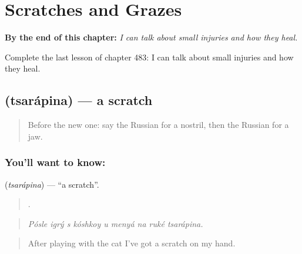 
\chapter{Scratches and Grazes}
\label{ch:ru-scratches-and-grazes}

\begin{chapteropening}
\textbf{By the end of this chapter:} \emph{I can talk about small injuries and how they heal.}

Complete the last lesson of chapter 483: I can talk about small injuries and how they heal.
\end{chapteropening}

\section[\texorpdfstring{\ru{царапина} (tsarápina)}{царапина (tsarápina)}]{ (tsarápina) — a scratch}

\label{lesson:RU-C483-tsarapina}



\begin{quote}
Before the new one: say the Russian for a nostril, then the Russian for a jaw.
\end{quote}

\subsection*{You'll want to know: }
\textbf{} (\emph{tsarápina}) — \textquotedblleft{}a scratch\textquotedblright{}.

\begin{quote}
        .
\end{quote}

\begin{quote}
\emph{Pósle igrý s kóshkoy u menyá na ruké tsarápina.}
\end{quote}

\begin{quote}
After playing with the cat I've got a scratch on my hand.
\end{quote}

